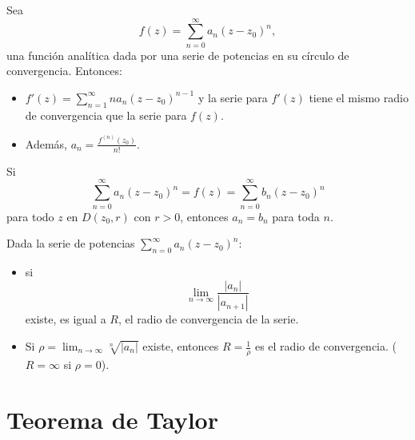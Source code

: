 \documentclass[spanish,presentation]{beamer}
\begin{document}
\begin{frame}[label=sec-2-3]{}
\begin{theorem}
Sea
\begin{displaymath}
f(z)=\sum_{n=0}^{\infty}a_{n}(z-z_{0})^{n},
\end{displaymath}
una función analítica dada por una serie de potencias en su
círculo de convergencia. Entonces:
\begin{itemize}
\item \(f'(z)=\sum_{n=1}^{\infty}na_{n}(z-z_{0})^{n-1}\) y la
serie para \(f'(z)\) tiene el mismo radio de convergencia que la
serie para \(f(z)\).
\item Además, \(a_{n}=\frac{f^{(n)}(z_{0})}{n!}\).
\end{itemize}
\end{theorem}
\end{frame}

\begin{frame}[label=sec-2-4]{}
\begin{corollary}[Unicidad]
Si
\begin{displaymath}
\sum_{n=0}^{\infty}a_{n}(z-z_{0})^{n}=f(z)=\sum_{n=0}^{\infty}b_{n}(z-z_{0})^{n}
\end{displaymath}
para todo \(z\) en \(D(z_{0},r)\) con \(r>0\), entonces
\(a_{n}=b_{n}\) para toda \(n\).
\end{corollary}
\end{frame}

\begin{frame}[label=sec-2-5]{}
\begin{theorem}
Dada la serie de potencias
\(\sum_{n=0}^{\infty}a_{n}(z-z_{0})^{n}\):

\begin{itemize}
\item si
\begin{displaymath}
\lim_{n\to\infty}\frac{|a_{n}|}{|a_{n+1}|}
\end{displaymath}
existe, es igual a \(R\), el radio de convergencia de la serie.
\item Si \(\rho=\lim_{n\to\infty} \sqrt[n]{|a_{n}|}\) existe, entonces
\(R=\frac{1}{\rho}\) es el radio de convergencia. (\(R=\infty\)
si \(\rho=0\)).
\end{itemize}
\end{theorem}
\end{frame}

\section{Teorema de Taylor}
\label{sec:orgheadline1}
\end{document}
